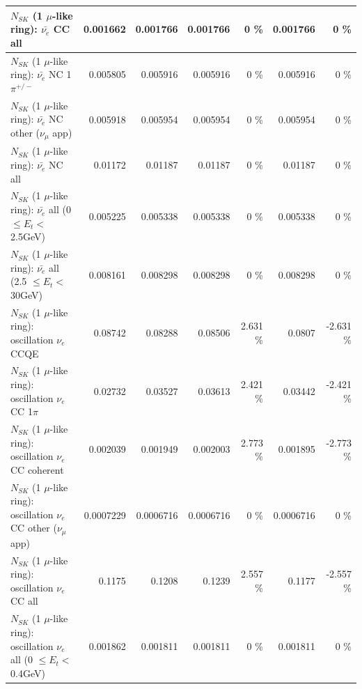 \begin{table}
\begin{tabular}{| l | r | r | r  r | r  r |}
                            $N_{SK}$ (1 $\mu$-like ring): $\bar{\nu_{e}}$ CC all &        0.001662 &        0.001766 &        0.001766 &        0 \%  &        0.001766 &        0 \%  \\ 
\hline
                     $N_{SK}$ (1 $\mu$-like ring): $\bar{\nu_e}$ NC 1$\pi^{+/-}$ &        0.005805 &        0.005916 &        0.005916 &        0 \%  &        0.005916 &        0 \%  \\ 
            $N_{SK}$ (1 $\mu$-like ring): $\bar{\nu_e}$ NC other ($\nu_\mu$ app) &        0.005918 &        0.005954 &        0.005954 &        0 \%  &        0.005954 &        0 \%  \\ 
                            $N_{SK}$ (1 $\mu$-like ring): $\bar{\nu_{e}}$ NC all &         0.01172 &         0.01187 &         0.01187 &        0 \%  &         0.01187 &        0 \%  \\ 
\hline
     $N_{SK}$ (1 $\mu$-like ring): $\bar{\nu_{e}}$ all (0 $\leq E_{t} <$ 2.5GeV) &        0.005225 &        0.005338 &        0.005338 &        0 \%  &        0.005338 &        0 \%  \\ 
    $N_{SK}$ (1 $\mu$-like ring): $\bar{\nu_{e}}$ all (2.5 $\leq E_{t} <$ 30GeV) &        0.008161 &        0.008298 &        0.008298 &        0 \%  &        0.008298 &        0 \%  \\ 
\hline
\hline
\hline
                          $N_{SK}$ (1 $\mu$-like ring): oscillation $\nu_e$ CCQE &         0.08742 &         0.08288 &         0.08506 &    2.631 \%  &          0.0807 &   -2.631 \%  \\ 
                     $N_{SK}$ (1 $\mu$-like ring): oscillation $\nu_e$ CC 1$\pi$ &         0.02732 &         0.03527 &         0.03613 &    2.421 \%  &         0.03442 &   -2.421 \%  \\ 
                   $N_{SK}$ (1 $\mu$-like ring): oscillation $\nu_e$ CC coherent &        0.002039 &        0.001949 &        0.002003 &    2.773 \%  &        0.001895 &   -2.773 \%  \\ 
      $N_{SK}$ (1 $\mu$-like ring): oscillation $\nu_e$ CC other ($\nu_\mu$ app) &       0.0007229 &       0.0006716 &       0.0006716 &        0 \%  &       0.0006716 &        0 \%  \\ 
                       $N_{SK}$ (1 $\mu$-like ring): oscillation $\nu_e$  CC all &          0.1175 &          0.1208 &          0.1239 &    2.557 \%  &          0.1177 &   -2.557 \%  \\ 
\hline
$N_{SK}$ (1 $\mu$-like ring): oscillation $\nu_{e}$ all (0 $\leq E_{t} <$ 0.4GeV) &        0.001862 &        0.001811 &        0.001811 &        0 \%  &        0.001811 &        0 \%  \\ 

\end{tabular}
\end{table}
